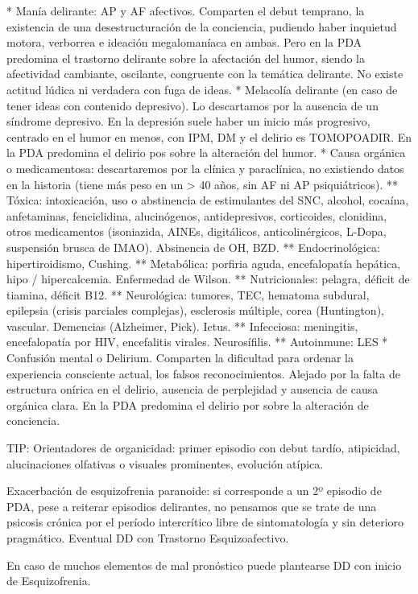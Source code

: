 * Manía delirante: AP y AF afectivos. Comparten el debut temprano, la existencia de una desestructuración de la conciencia, pudiendo haber inquietud motora, verborrea e ideación megalomaníaca en ambas. Pero en la PDA predomina el trastorno delirante sobre la afectación del humor, siendo la afectividad cambiante, oscilante, congruente con la temática delirante. No existe actitud lúdica ni verdadera con fuga de ideas.
* Melacolía delirante (en caso de tener ideas con contenido depresivo). Lo descartamos por la ausencia de un síndrome depresivo. En la depresión suele haber un inicio más progresivo, centrado en el humor en menos, con IPM, DM y el delirio es TOMOPOADIR. En la PDA predomina el delirio pos sobre la alteración del humor.
* Causa orgánica o medicamentosa: descartaremos por la clínica y paraclínica, no existiendo datos en la historia (tiene más peso en un > 40 años, sin AF ni AP psiquiátricos).
** Tóxica: intoxicación, uso o abstinencia de estimulantes del SNC, alcohol, cocaína, anfetaminas, fenciclidina, alucinógenos, antidepresivos, corticoides, clonidina, otros medicamentos (isoniazida, AINEs, digitálicos, anticolinérgicos, L-Dopa, suspensión brusca de IMAO). Absinencia de OH, BZD.
** Endocrinológica: hipertiroidismo, Cushing.
** Metabólica: porfiria aguda, encefalopatía hepática, hipo / hipercalcemia. Enfermedad de Wilson.
** Nutricionales: pelagra, déficit de tiamina, déficit B12.
** Neurológica: tumores, TEC, hematoma subdural, epilepsia (crisis parciales complejas), esclerosis múltiple, corea (Huntington), vascular. Demencias (Alzheimer, Pick). Ictus.
** Infecciosa: meningitis, encefalopatía por HIV, encefalitis virales. Neurosífilis.
** Autoinmune: LES
* Confusión mental o Delirium. Comparten la dificultad para ordenar la experiencia consciente actual, los falsos reconocimientos. Alejado por la falta de estructura onírica en el delirio, ausencia de perplejidad y ausencia de causa orgánica clara. En la PDA predomina el delirio por sobre la alteración de conciencia.

TIP: Orientadores de organicidad: primer episodio con debut tardío, atipicidad, alucinaciones olfativas o visuales prominentes, evolución atípica.

Exacerbación de esquizofrenia paranoide: si corresponde a un 2º episodio de PDA, pese a reiterar episodios delirantes, no pensamos que se trate de una psicosis crónica por el período intercrítico libre de sintomatología y sin deterioro pragmático. Eventual DD con Trastorno Esquizoafectivo.

En caso de muchos elementos de mal pronóstico puede plantearse DD con inicio de Esquizofrenia.

